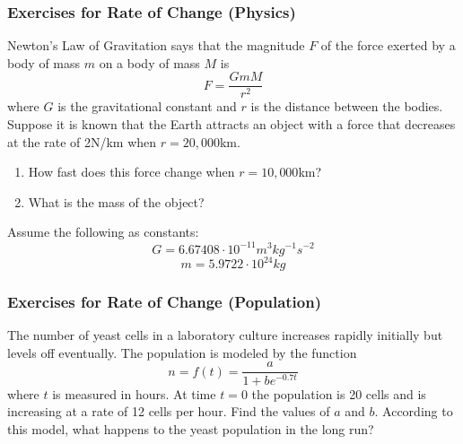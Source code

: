\documentclass[xcolor=dvipsnames]{beamer}
\begin{document}
\begin{frame}
  \frametitle{Exercises for Rate of Change (Physics)}
Newton's Law of Gravitation says that the magnitude $F$ of the force
exerted by a body of mass $m$ on a body of mass $M$ is 
\begin{equation}
  \label{eq:zeipouqu}
  F=\frac{GmM}{r^{2}}
\end{equation}
where $G$ is the gravitational constant and $r$ is the distance
between the bodies. Suppose it is known that the Earth attracts an
object with a force that decreases at the rate of 2N/km when
$r=20,000$km. 
\begin{enumerate}
\item<1-> How fast does this force change when $r=10,000$km? 
\item<2-> What is the mass of the object?
\end{enumerate}
Assume the following as constants:
\begin{equation}
  \label{eq:phosulee}
  G=6.67408\cdot{}10^{-11}m^{3}kg^{-1}s^{-2}
\end{equation}
\begin{equation}
  \label{eq:otienaix}
  m=5.9722\cdot{}10^{24}kg
\end{equation}
\end{frame}

\begin{frame}
  \frametitle{Exercises for Rate of Change (Population)}
The number of yeast cells in a laboratory culture increases rapidly
initially but levels off eventually. The population is modeled by the
function
\begin{equation}
  \label{eq:kupeivae}
  n=f(t)=\frac{a}{1+be^{-0.7t}}
\end{equation}
where $t$ is measured in hours. At time $t=0$ the population is 20
cells and is increasing at a rate of 12 cells per hour. Find the
values of $a$ and $b$. According to this model, what happens to the
yeast population in the long run?
\end{frame}
\end{document}
